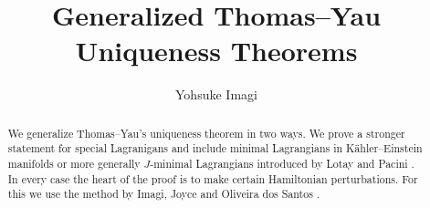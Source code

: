 \documentclass{article}
\title{Generalized Thomas--Yau Uniqueness Theorems}
\author{Yohsuke Imagi}
\theoremstyle{plain}%
\theoremstyle{definition}
\numberwithin{equation}{section}
\numberwithin{figure}{section}
\def\iy{\infty}
\begin{document}
\maketitle


\begin{abstract}
We generalize Thomas--Yau's uniqueness theorem \cite[Theorem 4.3]{TY} in two ways.
We prove a stronger statement for special Lagranigans and
include minimal Lagrangians in K\"ahler--Einstein manifolds
or more generally $J$-minimal Lagrangians introduced by Lotay and Pacini \cite{LP,LP2}.
In every case the heart of the proof is to make certain Hamiltonian perturbations.
For this we use the method by Imagi, Joyce and Oliveira dos Santos \cite[Theorem 4.7]{IJO}.
\end{abstract}
\end{document}
